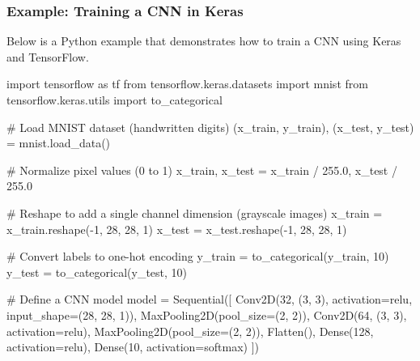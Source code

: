 \documentclass[
  letterpaper,
  DIV=11,
  numbers=noendperiod]{scrreprt}
\newenvironment{Shaded}{\begin{snugshade}}{\end{snugshade}}
\newcommand{\CommentTok}[1]{\textcolor[rgb]{0.37,0.37,0.37}{#1}}
\newcommand{\DecValTok}[1]{\textcolor[rgb]{0.68,0.00,0.00}{#1}}
\newcommand{\FloatTok}[1]{\textcolor[rgb]{0.68,0.00,0.00}{#1}}
\newcommand{\ImportTok}[1]{\textcolor[rgb]{0.00,0.46,0.62}{#1}}
\newcommand{\NormalTok}[1]{\textcolor[rgb]{0.00,0.23,0.31}{#1}}
\newcommand{\OperatorTok}[1]{\textcolor[rgb]{0.37,0.37,0.37}{#1}}
\newcommand{\StringTok}[1]{\textcolor[rgb]{0.13,0.47,0.30}{#1}}
\begin{document}
\subsubsection{Example: Training a CNN in
Keras}\label{example-training-a-cnn-in-keras}

Below is a Python example that demonstrates how to train a CNN using
Keras and TensorFlow.

\begin{Shaded}
\begin{Highlighting}[]
\ImportTok{import}\NormalTok{ tensorflow }\ImportTok{as}\NormalTok{ tf}
\ImportTok{from}\NormalTok{ tensorflow.keras.datasets }\ImportTok{import}\NormalTok{ mnist}
\ImportTok{from}\NormalTok{ tensorflow.keras.utils }\ImportTok{import}\NormalTok{ to\_categorical}

\CommentTok{\# Load MNIST dataset (handwritten digits)}
\NormalTok{(x\_train, y\_train), (x\_test, y\_test) }\OperatorTok{=}\NormalTok{ mnist.load\_data()}

\CommentTok{\# Normalize pixel values (0 to 1)}
\NormalTok{x\_train, x\_test }\OperatorTok{=}\NormalTok{ x\_train }\OperatorTok{/} \FloatTok{255.0}\NormalTok{, x\_test }\OperatorTok{/} \FloatTok{255.0}

\CommentTok{\# Reshape to add a single channel dimension (grayscale images)}
\NormalTok{x\_train }\OperatorTok{=}\NormalTok{ x\_train.reshape(}\OperatorTok{{-}}\DecValTok{1}\NormalTok{, }\DecValTok{28}\NormalTok{, }\DecValTok{28}\NormalTok{, }\DecValTok{1}\NormalTok{)}
\NormalTok{x\_test }\OperatorTok{=}\NormalTok{ x\_test.reshape(}\OperatorTok{{-}}\DecValTok{1}\NormalTok{, }\DecValTok{28}\NormalTok{, }\DecValTok{28}\NormalTok{, }\DecValTok{1}\NormalTok{)}

\CommentTok{\# Convert labels to one{-}hot encoding}
\NormalTok{y\_train }\OperatorTok{=}\NormalTok{ to\_categorical(y\_train, }\DecValTok{10}\NormalTok{)}
\NormalTok{y\_test }\OperatorTok{=}\NormalTok{ to\_categorical(y\_test, }\DecValTok{10}\NormalTok{)}

\CommentTok{\# Define a CNN model}
\NormalTok{model }\OperatorTok{=}\NormalTok{ Sequential([}
\NormalTok{    Conv2D(}\DecValTok{32}\NormalTok{, (}\DecValTok{3}\NormalTok{, }\DecValTok{3}\NormalTok{), activation}\OperatorTok{=}\StringTok{\textquotesingle{}relu\textquotesingle{}}\NormalTok{, input\_shape}\OperatorTok{=}\NormalTok{(}\DecValTok{28}\NormalTok{, }\DecValTok{28}\NormalTok{, }\DecValTok{1}\NormalTok{)),}
\NormalTok{    MaxPooling2D(pool\_size}\OperatorTok{=}\NormalTok{(}\DecValTok{2}\NormalTok{, }\DecValTok{2}\NormalTok{)),}
\NormalTok{    Conv2D(}\DecValTok{64}\NormalTok{, (}\DecValTok{3}\NormalTok{, }\DecValTok{3}\NormalTok{), activation}\OperatorTok{=}\StringTok{\textquotesingle{}relu\textquotesingle{}}\NormalTok{),}
\NormalTok{    MaxPooling2D(pool\_size}\OperatorTok{=}\NormalTok{(}\DecValTok{2}\NormalTok{, }\DecValTok{2}\NormalTok{)),}
\NormalTok{    Flatten(),}
\NormalTok{    Dense(}\DecValTok{128}\NormalTok{, activation}\OperatorTok{=}\StringTok{\textquotesingle{}relu\textquotesingle{}}\NormalTok{),}
\NormalTok{    Dense(}\DecValTok{10}\NormalTok{, activation}\OperatorTok{=}\StringTok{\textquotesingle{}softmax\textquotesingle{}}\NormalTok{)}
\NormalTok{])}


\end{Highlighting}
\end{Shaded}
\end{document}
